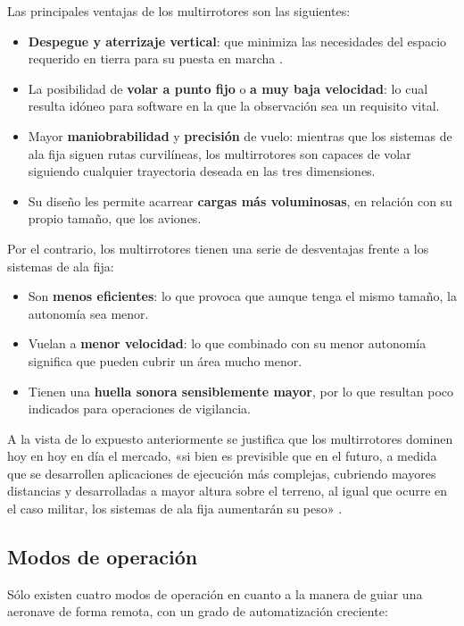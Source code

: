 Las principales ventajas de los multirrotores son las siguientes:

\begin{itemize}
\item \textbf{Despegue y aterrizaje vertical}: que minimiza las necesidades del espacio requerido en tierra para su puesta en marcha	.
\item La posibilidad de \textbf{volar a punto fijo} o \textbf{a muy baja velocidad}: lo cual resulta idóneo para software en la que la observación sea un requisito vital.
\item Mayor \textbf{maniobrabilidad} y \textbf{precisión} de vuelo: mientras que los sistemas de ala fija siguen rutas curvilíneas, los multirrotores son capaces de volar siguiendo cualquier trayectoria deseada en las tres dimensiones.
\item Su diseño les permite acarrear \textbf{cargas más voluminosas}, en relación con su propio tamaño, que los aviones.
\end{itemize}

Por el contrario, los multirrotores tienen una serie de desventajas frente a los sistemas de ala fija:

\begin{itemize}
\item Son \textbf{menos eficientes}: lo que provoca que aunque tenga el mismo tamaño, la autonomía sea menor.
\item Vuelan a \textbf{menor velocidad}: lo que combinado con su menor autonomía significa que pueden cubrir un área mucho menor.
\item Tienen una \textbf{huella sonora sensiblemente mayor}, por lo que resultan poco indicados para operaciones de vigilancia.
\end{itemize}

A la vista de lo expuesto anteriormente se justifica que los multirrotores dominen hoy en hoy en día el mercado, 
«si bien es previsible que en el futuro, a medida que se desarrollen aplicaciones de ejecución más complejas, cubriendo 
mayores distancias y desarrolladas a mayor altura sobre el terreno, al igual que ocurre en el caso militar, los sistemas de ala 
fija aumentarán su peso» \cite{dron2}.

\subsection{Modos de operación}
\label{sec:mododeoperacion}

Sólo existen cuatro modos de operación en cuanto a la manera de guiar una aeronave de forma remota, 
con un grado de automatización creciente:

